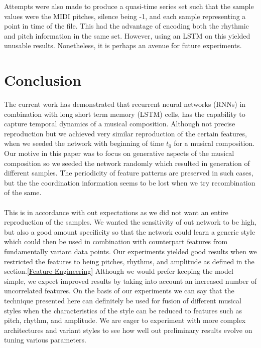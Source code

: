 \documentclass[conference]{IEEEtran}
\begin{document}
Attempts were also made to produce a quasi-time series set such that the sample values were the MIDI pitches, silence being -1, and each sample representing a point in time of the file. This had the advantage of encoding both the rhythmic and pitch information in the same set. However, using an LSTM on this yielded unusable results. Nonetheless, it is perhaps an avenue for future experiments.\\

\section{Conclusion}
The current work has demonstrated that recurrent neural networks (RNNs) in combination with long short term memory (LSTM) cells, has the capability to capture temporal dynamics of a musical composition. Although not precise reproduction but we achieved very similar reproduction of the certain features, when we seeded the network with beginning of time $t_0$ for a musical composition. Our motive in this paper was to focus on generative aspects of the musical composition so we seeded the network randomly which resulted in generation of different samples. The periodicity of feature patterns are preserved in such cases, but the the coordination information seems to be lost when we try recombination of the same.\\

\\This is in accordance with out expectations as we did not want an entire reproduction of the samples. We wanted the sensitivity of out network to be high, but also a good amount specificity so that the network could learn a generic style which could then be used in combination with counterpart features from fundamentally variant data points. Our experiments yielded good results when we restricted the features to being pitches, rhythms, and amplitude as defined in the section.\ref{Feature Engineering} Although we would prefer keeping the model simple, we expect improved results by taking into account an increased number of uncorrelated features. On the basis of our experiments we can say that the technique presented here can definitely be used for fusion of different musical styles when the characteristics of the style can be reduced to features such as pitch, rhythm, and amplitude. We are eager to experiment with more complex architectures and variant styles to see how well out preliminary results evolve on tuning various parameters.


\end{document}
